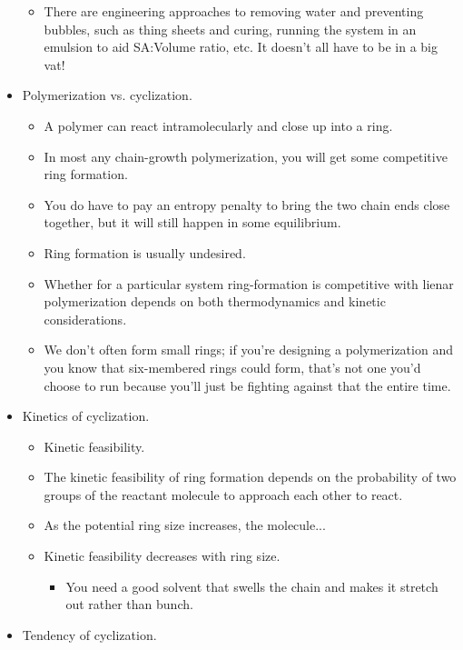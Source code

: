 \documentclass[../notes.tex]{subfiles}
\begin{document}
\begin{itemize}
\begin{itemize}
        \item There are engineering approaches to removing water and preventing bubbles, such as thing sheets and curing, running the system in an emulsion to aid SA:Volume ratio, etc. It doesn't all have to be in a big vat!
    \end{itemize}
    \item Polymerization vs. cyclization.
    \begin{itemize}
        \item A polymer can react intramolecularly and close up into a ring.
        \item In most any chain-growth polymerization, you will get some competitive ring formation.
        \item You do have to pay an entropy penalty to bring the two chain ends close together, but it will still happen in some equilibrium.
        \item Ring formation is usually undesired.
        \item Whether for a particular system ring-formation is competitive with lienar polymerization depends on both thermodynamics and kinetic considerations.
        \item We don't often form small rings; if you're designing a polymerization and you know that six-membered rings could form, that's not one you'd choose to run because you'll just be fighting against that the entire time.
    \end{itemize}
    \item Kinetics of cyclization.
    \begin{itemize}
        \item Kinetic feasibility.
        \item The kinetic feasibility of ring formation depends on the probability of two groups of the reactant molecule to approach each other to react.
        \item As the potential ring size increases, the molecule...
        \item Kinetic feasibility decreases with ring size.
        \begin{itemize}
            \item You need a good solvent that swells the chain and makes it stretch out rather than bunch.
        \end{itemize}
    \end{itemize}
    \item Tendency of cyclization.
    \begin{itemize}

\end{itemize}
\end{itemize}
\end{document}
